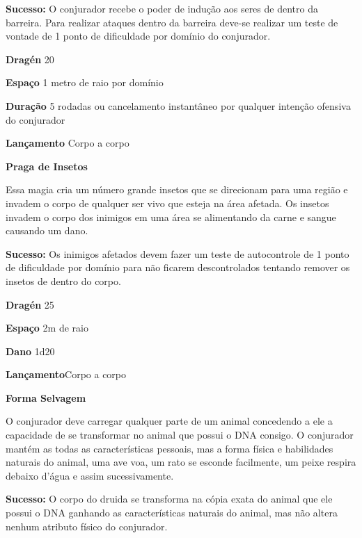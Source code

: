 \textbf{Sucesso:} O  conjurador  recebe  o  poder  de  indução  aos  seres  de  dentro  da  barreira.  Para  realizar  
ataques  dentro  da  barreira  deve-se  realizar  um  teste  de  vontade  de  1  ponto  de  dificuldade  por  domínio  do  conjurador.  

\textbf{Dragén} 20

\textbf{Espaço} 1 metro de raio por domínio

\textbf{Duração} 5 rodadas ou cancelamento instantâneo por qualquer intenção ofensiva do conjurador

\textbf{Lançamento} Corpo a corpo
\bigskip

\textbf{Praga  de  Insetos }

Essa  magia  cria  um  número  grande  insetos  que  se  direcionam  para  uma  região  e  invadem  o  corpo  de  
qualquer  ser  vivo  que  esteja  na  área  afetada.  Os  insetos  invadem  o  corpo  dos  inimigos  em  uma  área  
se  alimentando  da  carne  e  sangue  causando  um  dano.  

\textbf{Sucesso:} Os  inimigos  afetados  devem  fazer  um  teste  de  autocontrole  de  1  ponto  de  dificuldade  por  
domínio  para  não  ficarem  descontrolados  tentando  remover  os  insetos  de  dentro  do  corpo.  

\textbf{Dragén} 25

\textbf{Espaço} 2m de raio

\textbf{Dano} 1d20


\textbf{Lançamento}Corpo a corpo
\bigskip

\textbf{Forma  Selvagem   }

O  conjurador  deve  carregar  qualquer  parte  de  um  animal  
concedendo  a  ele  a  capacidade  de  se  
transformar  no  animal  que  possui  o  DNA  consigo.  O  conjurador  mantém  as  todas  as  características  
pessoais,  mas  a  forma  física  e  habilidades  naturais  do  animal,  uma  ave  voa,  um  rato  se  esconde  
facilmente,  um  peixe  respira  debaixo  d'água  e  assim  sucessivamente.  

\textbf{Sucesso:}  O  corpo  do  druida  se  transforma  na  cópia  exata  do  animal  que  ele  possui  o  DNA  ganhando  
as  características  naturais  do  animal,  mas  não  altera  nenhum  atributo  físico  do  conjurador.

